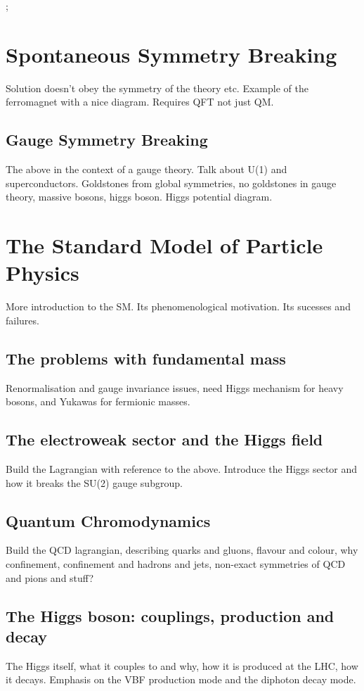  ;






\section{Spontaneous Symmetry Breaking}

Solution doesn't obey the symmetry of the theory etc. Example of the ferromagnet with a nice diagram. Requires QFT not just QM. 




\subsection{Gauge Symmetry Breaking}
The above in the context of a gauge theory. Talk about U(1) and superconductors. Goldstones from global symmetries, no goldstones in gauge theory, massive bosons, higgs boson. Higgs potential diagram. 



\section{The Standard Model of Particle Physics}
More introduction to the SM. Its phenomenological motivation. Its sucesses and failures. 

\subsection{The problems with fundamental mass}
Renormalisation and gauge invariance issues, need Higgs mechanism for heavy bosons, and Yukawas for fermionic masses.

\subsection{The electroweak sector and the Higgs field}
Build the Lagrangian with reference to the above. Introduce the Higgs sector and how it breaks the SU(2) gauge subgroup.

\subsection{Quantum Chromodynamics}
Build the QCD lagrangian, describing quarks and gluons, flavour and colour, why confinement, confinement and hadrons and jets, non-exact symmetries of QCD and pions and stuff?

\subsection{The Higgs boson: couplings, production and decay}
The Higgs itself, what it couples to and why, how it is produced at the LHC, how it decays. Emphasis on the VBF production mode and the diphoton decay mode. 
